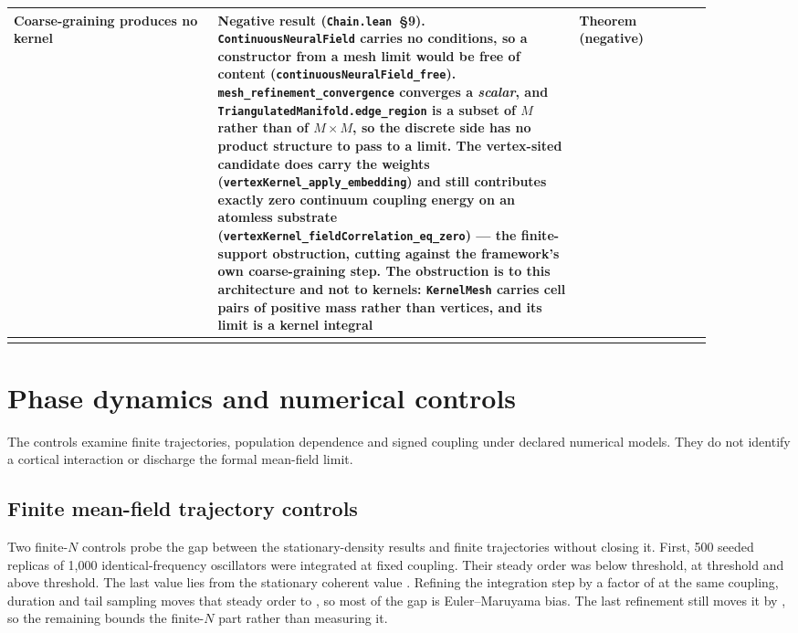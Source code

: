 \documentclass{article}
\begin{document}
\begin{longtable}{|>{\raggedright\arraybackslash}p{0.26\linewidth}|>{\raggedright\arraybackslash}p{0.46\linewidth}|>{\raggedright\arraybackslash}p{0.17\linewidth}|}
Coarse-graining produces no kernel & \textbf{Negative result} (\texttt{Chain.lean}~\S9). \texttt{ContinuousNeuralField} carries no conditions, so a constructor from a mesh limit would be free of content (\nolinkurl{continuousNeuralField_free}). \nolinkurl{mesh_refinement_convergence} converges a \emph{scalar}, and \nolinkurl{TriangulatedManifold.edge_region} is a subset of $M$ rather than of $M \times M$, so the discrete side has no product structure to pass to a limit. The vertex-sited candidate does carry the weights (\nolinkurl{vertexKernel_apply_embedding}) and still contributes exactly zero continuum coupling energy on an atomless substrate (\nolinkurl{vertexKernel_fieldCorrelation_eq_zero}) --- the finite-support obstruction, cutting against the framework's own coarse-graining step. The obstruction is to this architecture and not to kernels: \texttt{KernelMesh} carries cell pairs of positive mass rather than vertices, and its limit is a kernel integral & Theorem (negative) \\ \hline
\label{tab:full}
\end{longtable}
\endgroup

\section{Phase dynamics and numerical controls}
\label{sec:supp-phase-controls}

The controls examine finite trajectories, population dependence and signed coupling under declared numerical models. They do not identify a cortical interaction or discharge the formal mean-field limit.

\subsection{Finite mean-field trajectory controls}

Two finite-$N$ controls probe the gap between the stationary-density results and finite trajectories without closing it.  First, 500 seeded
replicas of 1,000 identical-frequency oscillators were integrated at fixed
coupling.  Their steady order was \selectionSubOrder{} below threshold,
\selectionCriticalOrder{} at threshold and \selectionSuperOrder{} above
threshold.  The last value lies \selectionStaticResidual{} from the stationary
coherent value \selectionTheoryOrder.  Refining the integration step by a factor
of \selectionDtRefinement{} at the same coupling, duration and tail sampling
moves that steady order to \selectionSuperOrderDtFine, so most of the gap is
Euler--Maruyama bias.  The last refinement still moves it by
\selectionDtLastChange, so the remaining \selectionStaticResidualDtFine{}
bounds the finite-$N$ part rather than measuring it.
\end{document}
